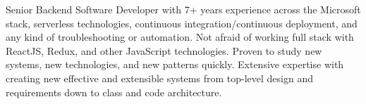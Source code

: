 \par{
    Senior Backend Software Developer with 7+ years experience across the Microsoft stack, serverless technologies, continuous integration/continuous deployment, and any kind of troubleshooting or automation. Not afraid of working full stack with ReactJS, Redux, and other JavaScript technologies. Proven to study new systems, new technologies, and new patterns quickly. Extensive expertise with creating new effective and extensible systems from top-level design and requirements down to class and code architecture.
}
